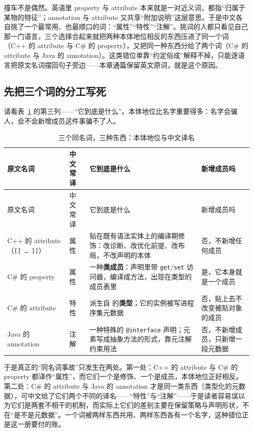 \documentclass[12pt,a4paper,fontset=fandol]{ctexbook}
\newcommand{\cpp}[1]{C++#1}
\newcommand{\kw}[1]{\texttt{#1}}
\newcommand{\seqkw}[1]{\seqsplit{\texttt{#1}}}
\begin{document}
撞车不是偶然。英语里 property 与 attribute 本来就是一对近义词，都指“归属于某物的特征”；annotation 与 attribute 又共享“附加说明”这层意思。于是中文各自挑了一个最常用、也最顺口的词：“属性”“特性”“注解”。挑词的人都只看见自己那一门语言，三个选择合起来就把两种本体地位相反的东西压进了同一个词（\cpp{} 的 attribute 与 C\# 的 property），又把同一种东西分给了两个词（C\# 的 attribute 与 Java 的 annotation）。这类错位单靠“约定俗成”解释不掉，只能逐语言把原文名词摆回句子旁边——本章通篇保留英文原词，就是这个原因。

\subsection*{先把三个词的分工写死}

请看表~\ref{tab:ch1-names} 的第三列——“它到底是什么”。本体地位比名字重要得多：名字会骗人，会不会新增成员这件事骗不了人。

{\footnotesize
\begin{longtable}{@{}>{\raggedright\arraybackslash}p{}>{\raggedright\arraybackslash}p{}>{\raggedright\arraybackslash}p{}>{\raggedright\arraybackslash}p{}@{}}
\caption{三个同名词，三种东西：本体地位与中文译名}\label{tab:ch1-names}\\
\toprule
原文名词 & 中文常译 & 它到底是什么 & 新增成员吗 \\ \midrule
\endfirsthead
\toprule
原文名词 & 中文常译 & 它到底是什么 & 新增成员吗 \\ \midrule
\endhead
\bottomrule
\endfoot
\cpp{} 的 attribute（\texttt{[[\,\dots\,]]}） & 属性 & 贴在既有语法实体上的编译期修饰：改诊断、改优化前提、改布局，不改声明的本体 & 否，不新增任何成员 \\
C\# 的 property & 属性 & 一种\textbf{类成员}：声明里带 \kw{get}/\kw{set} 访问器，编译成方法，出现在类型的成员表里 & 是，它本身就是一个成员 \\
C\# 的 attribute & 特性 & 派生自 \seqkw{System.Attribute} 的\textbf{类型}；它的实例被写进程序集元数据 & 否，贴上去不改变被贴对象的成员 \\
Java 的 annotation & 注解 & 一种特殊的 \texttt{@interface} 声明；元素写成抽象方法的形式，靠元注解约束用法 & 否，不新增成员，只新增一段元数据 \\
\end{longtable}
}

于是真正的“同名词事故”只发生在两处。第一处：\cpp{} 的 attribute 与 C\# 的 property 都译作“属性”，而它们一个是修饰、一个是成员，本体地位正好相反。第二处：C\# 的 attribute 与 Java 的 annotation 才是同一类东西（类型化的元数据），可中文给了它们两个不同的译名——“特性”与“注解”——于是读者容易误以为它们是两套不相干的机制，而实际上它们的差别主要在保留策略与声明形状，不在“是不是元数据”。一个词被两样东西共用、两样东西各有一个名字，这种错位正是这一册要付的账。
\end{document}
